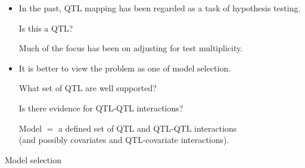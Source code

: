 \documentclass[12pt]{article}
\newcommand{\headsize}{\fontsize{35}{35} \selectfont}
\newcommand{\smallersize}{\fontsize{20}{25} \selectfont}
\begin{document}
\color{mywhite} \smallersize

\hfill \begin{minipage}[t]{10in}
\begin{itemize}
\itemsep20mm
\item In the past, QTL mapping has been regarded as a task of
  {\color{mypink} hypothesis testing}.

\vspace{10mm}

\hspace{15mm} {\color{myblue} Is this a QTL?}

\vspace{10mm}

Much of the focus has been on adjusting for test multiplicity.

\item It is better to view the problem as one of {\color{mypink} model
  selection}.

\vspace{10mm}

\hspace{15mm} {\color{myblue} What set of QTL are well supported?}

\hspace{15mm} {\color{myblue} Is there evidence for QTL-QTL
  interactions?}

\vspace{10mm}

{\color{mypink} Model} $\mathsf{=}$ a defined set of QTL and QTL-QTL interactions
\\
(and possibly covariates and QTL-covariate interactions).

\end{itemize}
\end{minipage}

\newpage

\headsize \color{myyellow}
\hfill \begin{minipage}{5.75in}
\centering
Model selection
\end{minipage}

\vspace{15mm} \color{mywhite} \smallersize
\end{document}
